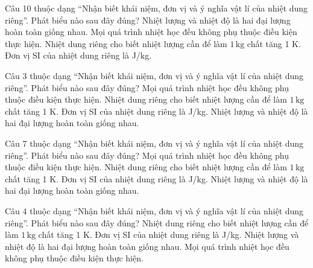 \begin{ex}
Câu 10 thuộc dạng “Nhận biết khái niệm, đơn vị và ý nghĩa vật lí của nhiệt dung riêng”. Phát biểu nào sau đây đúng?
\choice
{Nhiệt lượng và nhiệt độ là hai đại lượng hoàn toàn giống nhau.}
{Mọi quá trình nhiệt học đều không phụ thuộc điều kiện thực hiện.}
{\True Nhiệt dung riêng cho biết nhiệt lượng cần để làm $1\,\text{kg}$ chất tăng 1 K.}
{Đơn vị SI của nhiệt dung riêng là J/kg.}
\end{ex}

\begin{ex}
Câu 3 thuộc dạng “Nhận biết khái niệm, đơn vị và ý nghĩa vật lí của nhiệt dung riêng”. Phát biểu nào sau đây đúng?
\choice
{Mọi quá trình nhiệt học đều không phụ thuộc điều kiện thực hiện.}
{\True Nhiệt dung riêng cho biết nhiệt lượng cần để làm $1\,\text{kg}$ chất tăng 1 K.}
{Đơn vị SI của nhiệt dung riêng là J/kg.}
{Nhiệt lượng và nhiệt độ là hai đại lượng hoàn toàn giống nhau.}
\end{ex}

\begin{ex}
Câu 7 thuộc dạng “Nhận biết khái niệm, đơn vị và ý nghĩa vật lí của nhiệt dung riêng”. Phát biểu nào sau đây đúng?
\choice
{Mọi quá trình nhiệt học đều không phụ thuộc điều kiện thực hiện.}
{\True Nhiệt dung riêng cho biết nhiệt lượng cần để làm $1\,\text{kg}$ chất tăng 1 K.}
{Đơn vị SI của nhiệt dung riêng là J/kg.}
{Nhiệt lượng và nhiệt độ là hai đại lượng hoàn toàn giống nhau.}
\end{ex}

\begin{ex}
Câu 4 thuộc dạng “Nhận biết khái niệm, đơn vị và ý nghĩa vật lí của nhiệt dung riêng”. Phát biểu nào sau đây đúng?
\choice
{\True Nhiệt dung riêng cho biết nhiệt lượng cần để làm $1\,\text{kg}$ chất tăng 1 K.}
{Đơn vị SI của nhiệt dung riêng là J/kg.}
{Nhiệt lượng và nhiệt độ là hai đại lượng hoàn toàn giống nhau.}
{Mọi quá trình nhiệt học đều không phụ thuộc điều kiện thực hiện.}
\end{ex}

